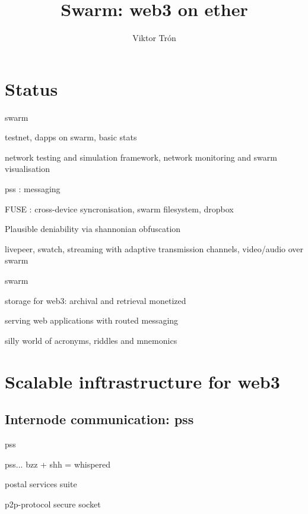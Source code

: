 \documentclass{beamer}
\title{Swarm: web3 on ether}
\author{Viktor Trón}
\begin{document}
\begin{frame}
 \titlepage
\end{frame}


\section{Status}
 



 \begin{frame}{swarm}
\begin{block}{}
testnet, dapps on swarm, basic stats
\end{block}
\begin{block}{}
 network testing and simulation framework, network monitoring and swarm visualisation
 \end{block}
 \begin{block}{}
pss : messaging
\end{block}
\begin{block}{}
FUSE : cross-device syncronisation, swarm filesystem, dropbox
 \end{block}
 \begin{block}{}
Plausible deniability via shannonian obfuscation
\end{block}
\begin{block}{}
livepeer, swatch, streaming with adaptive transmission channels, video/audio over swarm
\end{block}
 \end{frame}

\begin{frame}{swarm}
\begin{block}{}
storage for web3: archival and retrieval monetized
\end{block}
\begin{block}{}
serving web applications with routed messaging
\end{block}
\begin{block}{}
silly world of acronyms, riddles and mnemonics
\end{block}
\end{frame}

\section{Scalable inftrastructure for web3}

\subsection{Internode communication: pss}
\begin{frame}{pss}
\begin{block}{}
pss...  bzz + shh = whispered
\end{block}
\begin{block}{}
postal services suite
\end{block}
\begin{block}{}
p2p-protocol secure socket
\end{block}
\end{frame}
\end{document}
